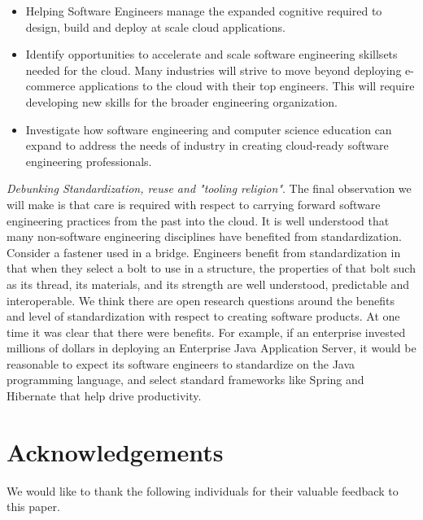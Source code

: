 \documentclass[conference]{IEEEconf}
\begin{document}
\begin{itemize}
	\item Helping Software Engineers manage the expanded cognitive required to design, build and deploy at scale cloud applications.
	\item Identify opportunities to accelerate and scale software engineering skillsets needed for the cloud. Many industries will strive to move beyond deploying e-commerce applications to the cloud with their top engineers. This will require developing new skills for the broader engineering organization.
	\item Investigate how software engineering and computer science education can expand to address the needs of industry in creating cloud-ready software engineering professionals. 
\end{itemize}



	\item \textit{Debunking Standardization, reuse and "tooling religion"}. The final observation we will make is that care is required with respect to carrying forward software engineering practices from the past into the cloud.  It is well understood that many non-software engineering disciplines have benefited from standardization. Consider a fastener used in a bridge.  Engineers benefit from standardization in that when they select a bolt to use in a structure, the properties of that bolt such as its thread, its materials, and its strength are well understood, predictable and interoperable. We think there are open research questions around the benefits and level of standardization with respect to creating software products.  At one time it was clear that there were benefits. For example, if an enterprise invested millions of dollars in deploying an Enterprise Java Application Server, it would be reasonable to expect its software engineers to standardize on the Java programming language, and select standard frameworks like Spring\cite{SpringFramework} and Hibernate that help drive productivity.	

\section{Acknowledgements}
We would like to thank the following individuals for their valuable feedback to this paper. 


\end{document}
